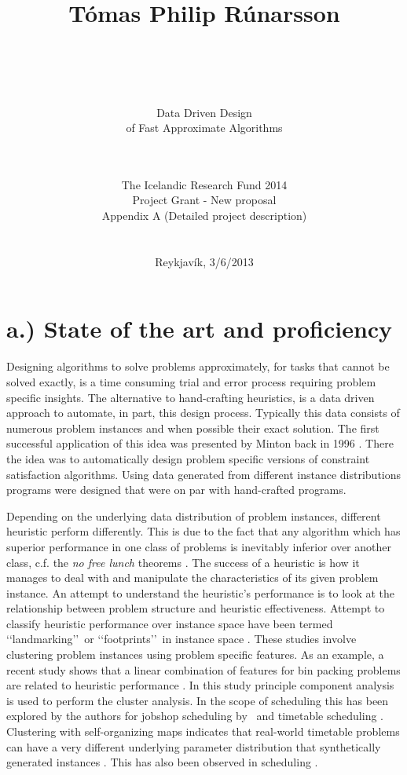 \documentclass[12pt,a4paper]{article}
\title{\large T\'omas Philip R\'unarsson \\ \ \\ \ \\ }
\author{\LARGE Data Driven Design\\ \LARGE of Fast Approximate Algorithms\\ \ \\ \ \\}
\date{The Icelandic Research Fund 2014\\
Project Grant - New proposal\\
Appendix A (Detailed project description)\\
\ \\ 
\ \\
\normalsize Reykjav\'ik, 3/6/2013}
\begin{document}
\maketitle
\pagestyle{fancy}
\thispagestyle{empty}


\newpage
\onehalfspacing

\section*{\normalsize a.) State of the art and proficiency}

Designing algorithms to solve problems approximately, for tasks that cannot be solved exactly, is a time consuming 
trial and error process requiring problem specific insights. The alternative to hand-crafting heuristics, is a data 
driven approach to automate, in part, this design process. Typically this data consists of numerous problem instances 
and when possible their exact solution. The first successful application of this idea was presented by Minton 
back in 1996 \cite{minton1996automatically}. There the idea was to automatically design problem specific versions of 
constraint satisfaction algorithms. Using data generated from different instance distributions programs were designed 
that were on par with hand-crafted programs. 

Depending on the underlying data distribution of problem instances, different heuristic perform differently. This 
is due to the fact that any algorithm which has superior performance in one class of problems is inevitably inferior 
over another class, c.f. the \emph{no free lunch} theorems \cite{Wolpert97nofree}. 
The success of a heuristic is how it manages to deal with and manipulate the characteristics of its given problem 
instance. An attempt to understand the heuristic's performance is to look at the relationship between problem 
structure and heuristic effectiveness. Attempt to classify heuristic performance over instance space have been termed 
\lq\lq landmarking\rq\rq\ or \lq\lq footprints\rq\rq\ in instance space \cite{Corne10,Pfahringer00}. These studies 
involve clustering problem instances using problem specific features. As an example, a recent study shows that a 
linear combination of features for bin packing problems are related to heuristic performance \cite{Camacho2013}. In 
this study principle component analysis is used to perform the cluster analysis.
In the scope of scheduling this has been explored by the authors for jobshop scheduling by~\cite{InRu12a} and 
timetable scheduling \cite{SmithMilesLion5,Smith-Miles2012a}. Clustering with self-organizing maps indicates that 
real-world timetable problems can have a very different underlying parameter distribution that synthetically generated 
instances \cite{SmithMilesLion5}. This has also been observed in scheduling \cite{Whitley}.
\end{document}
